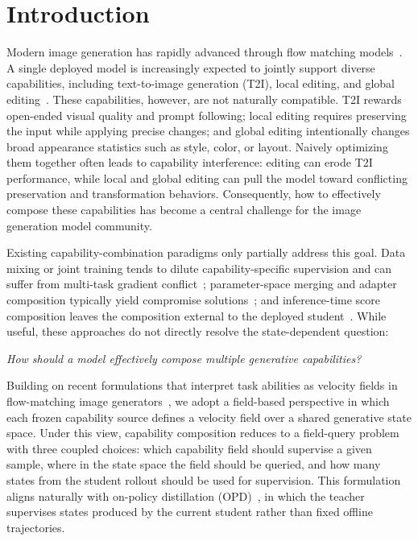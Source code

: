 \section{Introduction}
\label{sec:introduction}

Modern image generation has rapidly advanced through flow matching models~\cite{ho2020denoising,rombach2022high,peebles2023scalable,esser2024scaling,cai2025z,podell2024sdxl}. A single deployed model is increasingly expected to jointly support diverse capabilities, including text-to-image generation (T2I), local editing, and global editing~\cite{brooks2023instructpix2pix,yu2025anyedit,chow2025editmgt}. These capabilities, however, are not naturally compatible. T2I rewards open-ended visual quality and prompt following; local editing requires preserving the input while applying precise changes; and global editing intentionally changes broad appearance statistics such as style, color, or layout. Naively optimizing them together often leads to capability interference: editing can erode T2I performance, while local and global editing can pull the model toward conflicting preservation and transformation behaviors. Consequently, how to effectively compose these capabilities has become a central challenge for the image generation model community.


Existing capability-combination paradigms only partially address this goal. Data mixing or joint training tends to dilute capability-specific supervision and can suffer from multi-task gradient conflict~\cite{ilharco2022editing,wortsman2022model,matena2022merging,chen2018gradnorm,sener2018multi,javaloy2021rotograd}; parameter-space merging and adapter composition typically yield compromise solutions~\cite{ainsworth2022git,yadav2023ties,gal2022image,ruiz2023dreambooth,pfeiffer2021adapterfusion}; and inference-time score composition leaves the composition external to the deployed student~\cite{liu2022compositional,du2023reduce,bar2023multidiffusion}. While useful, these approaches do not directly resolve the state-dependent question: 

\textit{How should a model effectively compose multiple generative capabilities?}


Building on recent formulations that interpret task abilities as velocity fields in flow-matching image generators~\cite{lipman2022flow,liu2022flow,albergo2025stochastic,tong2023improving,dao2023flow}, we adopt a field-based perspective in which each frozen capability source defines a velocity field over a shared generative state space. Under this view, capability composition reduces to a field-query problem with three coupled choices: which capability field should supervise a given sample, where in the state space the field should be queried, and how many states from the student rollout should be used for supervision. This formulation aligns naturally with on-policy distillation (OPD)~\cite{ross2011reduction,gu2024minillm,agarwal2024policy,jia2026asymmetric}, in which the teacher supervises states produced by the current student rather than fixed offline trajectories.


